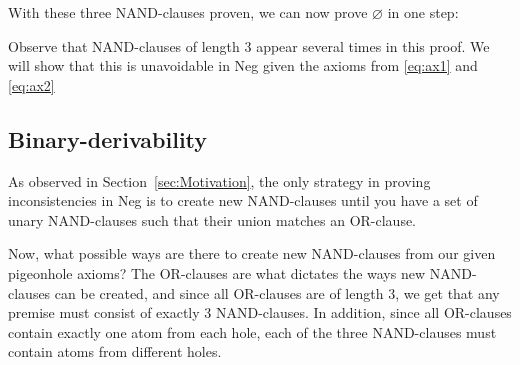 \begin{figure}[!h]
  \centering
  \begin{prooftree*}[separation=0.8em, rule margin=1ex]
  \end{prooftree*}
  \caption{}
  \label{fig:proof_34}
\end{figure}
\FloatBarrier
With these three NAND-clauses proven, we can now prove $\varnothing$ in one step:\par
\begin{figure}[!h]
  \centering
  \begin{prooftree*}[rule margin=1ex]
  \end{prooftree*}
  \caption{}
  \label{fig:proof_empty}
\end{figure}
Observe that NAND-clauses of length 3 appear several times in this proof.
We will show that this is unavoidable in Neg given the axioms from \ref{eq:ax1} and \ref{eq:ax2}
\subsection{Binary-derivability}
\label{sub:Binary-derivability}
As observed in Section~\ref{sec:Motivation}, the only strategy in proving inconsistencies in Neg is to create new NAND-clauses until you have a set of unary NAND-clauses such that their union matches an OR-clause.

Now, what possible ways are there to create new NAND-clauses from our given pigeonhole axioms?
The OR-clauses are what dictates the ways new NAND-clauses can be created, and since all OR-clauses are of length 3, we get that any premise must consist of exactly 3 NAND-clauses.
In addition, since all OR-clauses contain exactly one atom from each hole, each of the three NAND-clauses must contain atoms from different holes.

